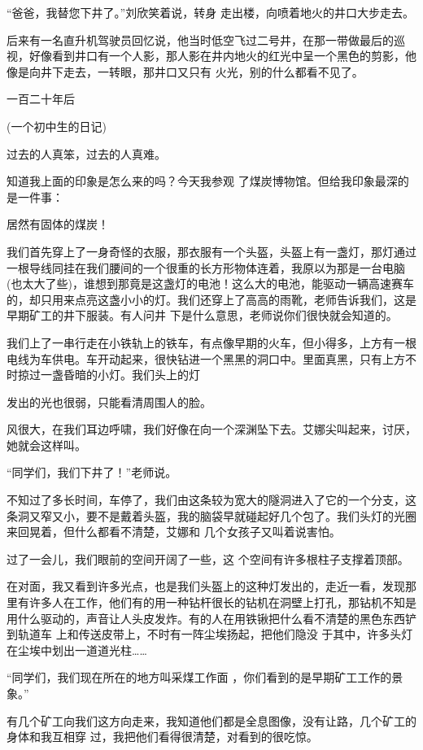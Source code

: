 \documentclass{article}
\begin{document}
“爸爸，我替您下井了。”刘欣笑着说，转身
走出楼，向喷着地火的井口大步走去。 

后来有一名直升机驾驶员回忆说，他当时低空飞过二号井，在那一带做最后的巡视，好像看到井口有一个人影，那人影在井内地火的红光中呈一个黑色的剪影，他像是向井下走去，一转眼，那井口又只有
火光，别的什么都看不见了。 



一百二十年后 


\newpage

(一个初中生的日记) 


过去的人真笨，过去的人真难。 

知道我上面的印象是怎么来的吗？今天我参观
了煤炭博物馆。但给我印象最深的是一件事： 


居然有固体的煤炭！ 

我们首先穿上了一身奇怪的衣服，那衣服有一个头盔，头盔上有一盏灯，那灯通过一根导线同挂在我们腰间的一个很重的长方形物体连着，我原以为那是一台电脑(也太大了些)，谁想到那竟是这盏灯的电池！这么大的电池，能驱动一辆高速赛车的，却只用来点亮这盏小小的灯。我们还穿上了高高的雨靴，老师告诉我们，这是早期矿工的井下服装。有人问井
下是什么意思，老师说你们很快就会知道的。 

我们上了一串行走在小铁轨上的铁车，有点像早期的火车，但小得多，上方有一根电线为车供电。车开动起来，很快钻进一个黑黑的洞口中。里面真黑，只有上方不时掠过一盏昏暗的小灯。我们头上的灯
\newpage

发出的光也很弱，只能看清周围人的脸。 

风很大，在我们耳边呼啸，我们好像在向一个深渊坠下去。艾娜尖叫起来，讨厌，她就会这样叫。


“同学们，我们下井了！”老师说。 

不知过了多长时间，车停了，我们由这条较为宽大的隧洞进入了它的一个分支，这条洞又窄又小，要不是戴着头盔，我的脑袋早就碰起好几个包了。我们头灯的光圈来回晃着，但什么都看不清楚，艾娜和
几个女孩子又叫着说害怕。 

过了一会儿，我们眼前的空间开阔了一些，这
个空间有许多根柱子支撑着顶部。 

在对面，我又看到许多光点，也是我们头盔上的这种灯发出的，走近一看，发现那里有许多人在工作，他们有的用一种钻杆很长的钻机在洞壁上打孔，那钻机不知是用什么驱动的，声音让人头皮发炸。有的人在用铁锹把什么看不清楚的黑色东西铲到轨道车
\newpage
上和传送皮带上，不时有一阵尘埃扬起，把他们隐没
于其中，许多头灯在尘埃中划出一道道光柱…… 

“同学们，我们现在所在的地方叫采煤工作面
，你们看到的是早期矿工工作的景象。” 

有几个矿工向我们这方向走来，我知道他们都是全息图像，没有让路，几个矿工的身体和我互相穿
过，我把他们看得很清楚，对看到的很吃惊。 
\end{document}
